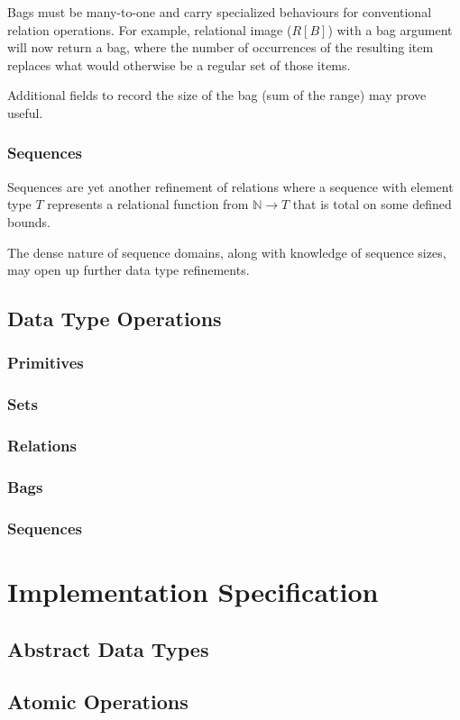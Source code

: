 \documentclass{article}
\begin{document}
Bags must be many-to-one and carry specialized behaviours for conventional relation operations. For example, relational image ($R[B]$) with a bag argument will now return a bag, where the number of occurrences of the resulting item replaces what would otherwise be a regular set of those items.

Additional fields to record the size of the bag (sum of the range) may prove useful.

\subsubsection{Sequences}
Sequences are yet another refinement of relations where a sequence with element type $T$ represents a relational function from $\mathbb{N} \rightarrow T$ that is total on some defined bounds.

The dense nature of sequence domains, along with knowledge of sequence sizes, may open up further data type refinements.

\subsection{Data Type Operations}
\subsubsection{Primitives}
\subsubsection{Sets}
\subsubsection{Relations}
\subsubsection{Bags}
\subsubsection{Sequences}

\section{Implementation Specification}
\subsection{Abstract Data Types}
\subsection{Atomic Operations}
\end{document}
